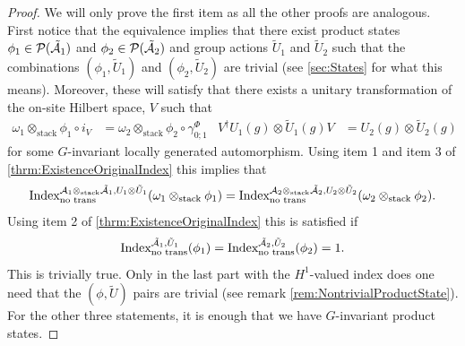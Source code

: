 \documentclass[11pt,a4paper,twoside]{article}
\numberwithin{equation}{section}
\begin{document}
	\begin{proof}
		We will only prove the first item as all the other proofs are analogous. First notice that the equivalence implies that there exist product states $\phi_1\in\PP(\tilde\AA_1)$ and $\phi_2\in\PP(\tilde\AA_2)$ and group actions $\tilde U_1$ and $\tilde U_2$ such that the combinations $(\phi_1,\tilde U_1)$ and $(\phi_2,\tilde U_2)$ are trivial (see \ref{sec:States} for what this means). Moreover, these will satisfy that there exists a unitary transformation of the on-site Hilbert space, $V$ such that
	\begin{align}
	\omega_1\otimes_{\text{stack}}\phi_1\circ i_V&=\omega_2\otimes_{\text{stack}}\phi_2\circ\gamma^\Phi_{0;1}&V^\dagger U_{1}(g)\otimes \tilde{U}_{1}(g)V&=U_{2}(g)\otimes \tilde{U}_{2}(g)
	\end{align}
	for some $G$-invariant locally generated automorphism. Using item 1 and item 3 of \ref{thrm:ExistenceOriginalIndex} this implies that
	\begin{equation}
	\textrm{Index}^{\AA_1\otimes_{\text{stack}}\tilde \AA_1,U_1\otimes \tilde U_1}_{\text{no trans}}(\omega_1\otimes_{\text{stack}}\phi_1) =\textrm{Index}^{\AA_2\otimes_{\text{stack}}\tilde \AA_2,U_2\otimes\tilde U_2}_{\text{no trans}}(\omega_2\otimes_{\text{stack}}\phi_2).
	\end{equation}
	Using item 2 of \ref{thrm:ExistenceOriginalIndex} this is satisfied if
	\begin{equation}
	\textrm{Index}^{\tilde \AA_1,\tilde U_1}_{\text{no trans}}(\phi_1)=\textrm{Index}^{\tilde \AA_2,\tilde U_2}_{\text{no trans}}(\phi_2)=1.
	\end{equation}
	This is trivially true. Only in the last part with the $H^1$-valued index does one need that the $(\phi,\tilde U)$ pairs are trivial (see remark \ref{rem:NontrivialProductState}). For the other three statements, it is enough that we have $G$-invariant product states.
	\end{proof}
	\clearpage
	\appendix
	
\end{document}
